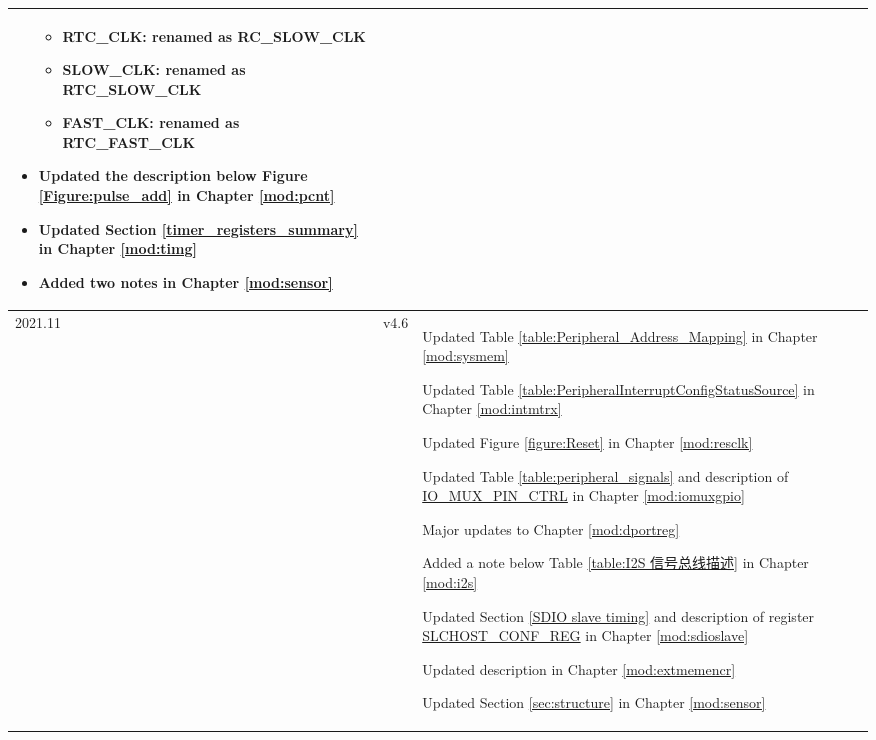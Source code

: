 \begin{longtable}[l]{ | m{2cm} | m{1.5cm} | m{12cm} | }
\begin{itemize}
\begin{itemize}
        \item RTC\_CLK: renamed as RC\_SLOW\_CLK
        \item SLOW\_CLK: renamed as RTC\_SLOW\_CLK
        \item FAST\_CLK: renamed as RTC\_FAST\_CLK %
    \end{itemize}
    \item Updated the description below Figure \ref{Figure:pulse_add} in Chapter \ref{mod:pcnt} \textit{\nameref{mod:pcnt}} %
    \item Updated Section \ref{timer_registers_summary} in Chapter \ref{mod:timg} \textit{\nameref{mod:timg}} %
    \item Added two notes in Chapter \ref{mod:sensor} \textit{\nameref{mod:sensor}} %
        \end{itemize}
        \vspace{-1em}
    \\\hline
    2021.11 & v4.6 &
    Updated Table \ref{table:Peripheral_Address_Mapping} in Chapter \ref{mod:sysmem} \textit{\nameref{mod:sysmem}} %

    Updated Table \ref{table:PeripheralInterruptConfigStatusSource} in Chapter \ref{mod:intmtrx} \textit{\nameref{mod:intmtrx}} %


    Updated Figure \ref{figure:Reset} in Chapter \ref{mod:resclk} \textit{\nameref{mod:resclk}} %

    Updated Table \ref{table:peripheral_signals} and description of \hyperref[regdesc:IOMUXPINCTRL]{IO\_MUX\_PIN\_CTRL} in Chapter \ref{mod:iomuxgpio} \textit{\nameref{mod:iomuxgpio}} %

    Major updates to Chapter \ref{mod:dportreg} \textit{\nameref{mod:dportreg}} %

    Added a note below Table \ref{table:I2S 信号总线描述} in Chapter \ref{mod:i2s} \textit{\nameref{mod:i2s}} %

    Updated Section \ref{SDIO slave timing} and description of register \hyperref[regdesc:SLCHOSTCONFREG]{SLCHOST\_CONF\_REG} in Chapter \ref{mod:sdioslave} \textit{\nameref{mod:sdioslave}} %


    Updated description in Chapter \ref{mod:extmemencr} \textit{\nameref{mod:extmemencr}} %

    Updated Section \ref{sec:structure} in Chapter \ref{mod:sensor} \textit{\nameref{mod:sensor}} %


\end{longtable}

